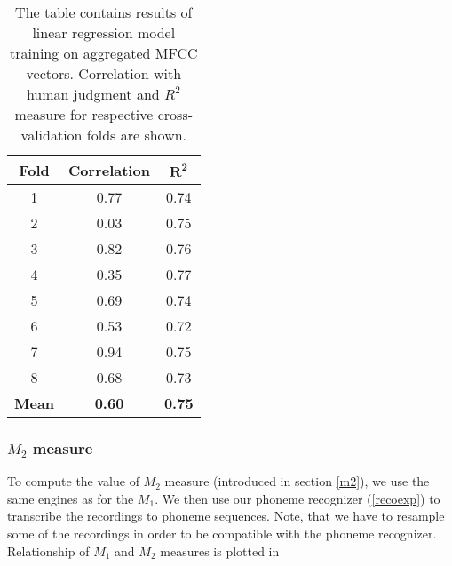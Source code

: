 \begin{table}
\begin{center}
\begin{tabular}{ |c|c|c| } 
 \hline
 \textbf{Fold} & \textbf{Correlation} & $\boldsymbol{R^2}$ \\ \hline
 1 & 0.77 & 0.74 \\ \hline
 2 & 0.03 & 0.75 \\ \hline
 3 & 0.82 & 0.76 \\ \hline
 4 & 0.35 & 0.77 \\ \hline
 5 & 0.69 & 0.74 \\ \hline
 6 & 0.53 & 0.72 \\ \hline
 7 & 0.94 & 0.75 \\ \hline
 8 & 0.68 & 0.73 \\ \hline
 \textbf{Mean} & \textbf{0.60} & \textbf{0.75} \\ \hline
 
 \end{tabular}
\end{center}
\label{cv}
\caption{The table contains results of linear regression model training on aggregated MFCC vectors. Correlation with human judgment and $R^2$ measure for respective cross-validation folds are shown.}
\end{table}
\subsubsection{$M_2$ measure}
To compute the  value of $M_2$ measure (introduced in section \ref{m2}), we use the same engines as for the $M_1$.
We then use our phoneme recognizer (\ref{recoexp}) to transcribe the recordings to phoneme sequences.
Note, that we have to resample some of the recordings in order to be compatible with the phoneme recognizer.
Relationship of $M_1$ and $M_2$ measures is plotted in 

